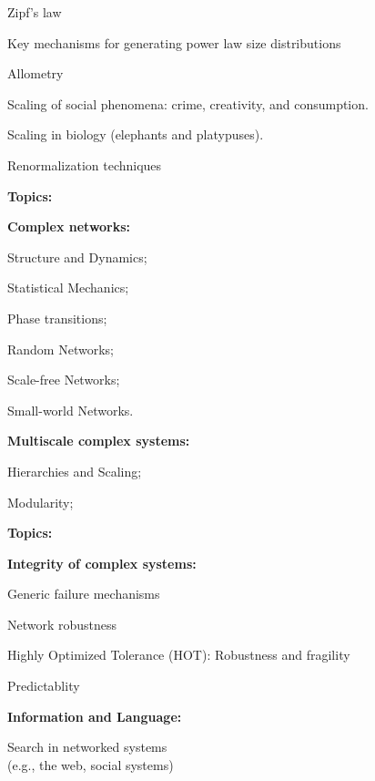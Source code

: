       Zipf's law
     
      Key mechanisms for generating power law size distributions
     
      Allometry
     
      Scaling of social phenomena: crime, creativity, and consumption.
     
      Scaling in biology (elephants and platypuses).
     
      Renormalization techniques
    
  




  \textbf{Topics:}

  \textbf{Complex networks:}
    
     
      Structure and Dynamics;
     
      Statistical Mechanics;
     
      Phase transitions;
     
      Random Networks;
     
      Scale-free Networks;
     
      Small-world Networks.
    
  

  \textbf{Multiscale complex systems:}
    
     
      Hierarchies and Scaling;
     
      Modularity;
    
  


  \textbf{Topics:}

  \textbf{Integrity of complex systems:}
    
     
      Generic failure mechanisms
     
      Network robustness
     
      Highly Optimized Tolerance (HOT): Robustness and fragility
     
      Predictablity
    
  

  \textbf{Information and Language:}
    
     
      Search in networked systems \\ (e.g., the web, social systems)
     

